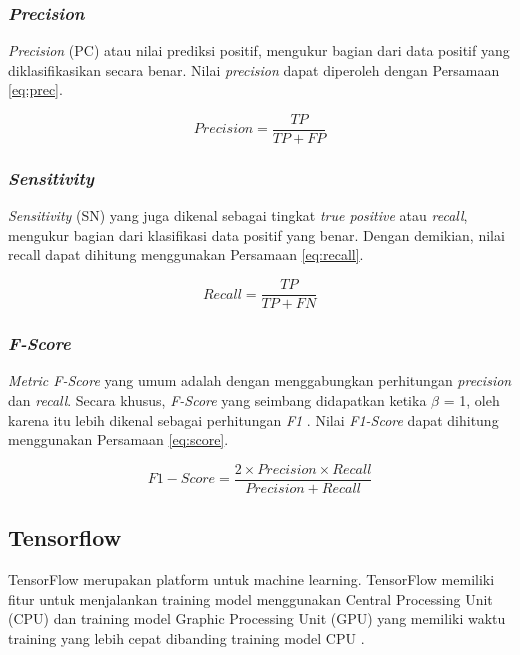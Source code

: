 \subsubsection{\emph{Precision}}
\label{subsec:prec_klasifikasi}

\emph{Precision} (PC) atau nilai prediksi positif, mengukur bagian dari data positif yang diklasifikasikan secara benar\parencite{Ovalle}. Nilai \emph{precision} dapat diperoleh dengan Persamaan \ref{eq:prec}.

\begin{equation}
  \label{eq:prec}
  Precision=\frac{TP}{TP+FP}
\end{equation}

\subsubsection{\emph{Sensitivity}}
\label{subsec:sensitivity_klasifikasi}

\emph{Sensitivity} (SN) yang juga dikenal sebagai tingkat \emph{true positive} atau \emph{recall}, mengukur bagian dari klasifikasi data positif yang benar\parencite{Ovalle}. Dengan demikian, nilai recall dapat dihitung menggunakan Persamaan \ref{eq:recall}.

\begin{equation}
  \label{eq:recall}
  Recall=\frac{TP}{TP+FN}
\end{equation}

\subsubsection{\emph{F-Score}}
\label{subsec:score_klasifikasi}

\emph{Metric F-Score} yang umum adalah dengan menggabungkan perhitungan \emph{precision} dan \emph{recall}. Secara khusus, \emph{F-Score} yang seimbang didapatkan ketika \(\beta\) = 1, oleh karena itu lebih dikenal sebagai perhitungan \emph{F1} \parencite{Ovalle}. Nilai \emph{F1-Score} dapat dihitung menggunakan Persamaan \ref{eq:score}.

\begin{equation}
  \label{eq:score}
  F{1}{-}Score=\frac{2 \times Precision \times Recall}{Precision+Recall}
\end{equation}

\subsection{Tensorflow}
TensorFlow merupakan platform untuk machine learning. TensorFlow memiliki fitur untuk menjalankan training model menggunakan Central Processing Unit (CPU) dan training model Graphic Processing Unit (GPU) yang memiliki waktu training yang lebih cepat dibanding training model CPU \parencite{nurfita2018}.

